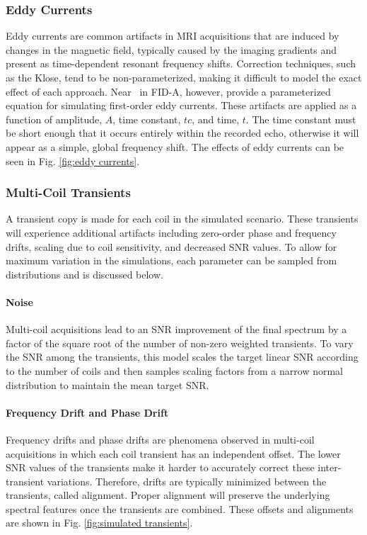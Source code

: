 \subsubsection{Eddy Currents}
Eddy currents are common artifacts in MRI acquisitions that are induced by changes in the magnetic field, typically caused by the imaging gradients and present as time-dependent resonant frequency shifts. Correction techniques, such as the Klose\cite{Klose1990}, tend to be non-parameterized, making it difficult to model the exact effect of each approach. Near \etal\ in FID-A\cite{Simpson2017}, however, provide a parameterized equation for simulating first-order eddy currents. These artifacts are applied as a function of amplitude, $A$, time constant, $tc$, and time, $t$. The time constant must be short enough that it occurs entirely within the recorded echo, otherwise it will appear as a simple, global frequency shift. The effects of eddy currents can be seen in Fig. \ref{fig:eddy currents}.



\subsubsection{Multi-Coil Transients}
A transient copy is made for each coil in the simulated scenario. These transients will experience additional artifacts including zero-order phase and frequency drifts, scaling due to coil sensitivity, and decreased SNR values. To allow for maximum variation in the simulations, each parameter can be sampled from distributions and is discussed below.

\paragraph{Noise} Multi-coil acquisitions lead to an SNR improvement of the final spectrum by a factor of the square root of the number of non-zero weighted transients. To vary the SNR among the transients, this model scales the target linear SNR according to the number of coils and then samples scaling factors from a narrow normal distribution to maintain the mean target SNR. 

\paragraph{Frequency Drift and Phase Drift}
Frequency drifts and phase drifts are phenomena observed in multi-coil acquisitions in which each coil transient has an independent offset. The lower SNR values of the transients make it harder to accurately correct these inter-transient variations. Therefore, drifts are typically minimized between the transients, called alignment. Proper alignment will preserve the underlying spectral features once the transients are combined. These offsets and alignments are shown in Fig. \ref{fig:simulated transients}.

